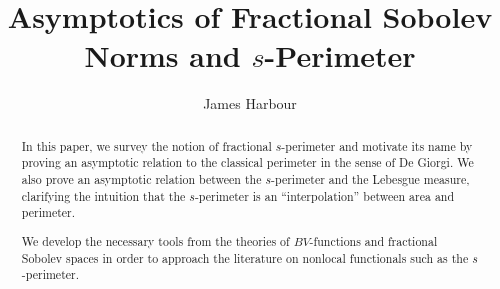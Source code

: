 \documentclass[reqno, openany, amssymb, psamsfonts]{amsart}
\title{Asymptotics of Fractional Sobolev Norms and $s$-Perimeter}
\author{James Harbour}
\numberwithin{equation}{section}
\begin{document}
\maketitle
\begin{abstract}
  In this paper, we survey the notion of fractional $ s $-perimeter and motivate its name by proving an asymptotic relation to the classical perimeter in the sense of De Giorgi. We also prove an asymptotic relation between the $ s $-perimeter and the Lebesgue measure, clarifying the intuition that the $ s $-perimeter is an ``interpolation'' between area and perimeter.

  We develop the necessary tools from the theories of $ BV $-functions and fractional Sobolev spaces in order to approach the literature on nonlocal functionals such as the $ s $-perimeter.
\end{abstract}

\tableofcontents






%














%








%
%
%
%
%
%


\newpage
\printbibliography
\end{document}

